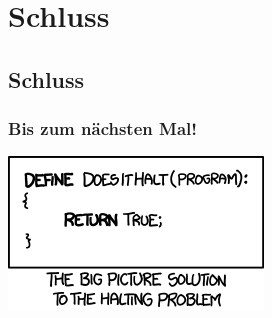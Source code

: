 \section{Schluss}
\subsection{Schluss}
\begin{frame}
	\frametitle{Bis zum nächsten Mal!}
    \begin{center}
        \includegraphics[width=\textwidth]{images/halting_problem.png}
    \end{center}
\end{frame}


